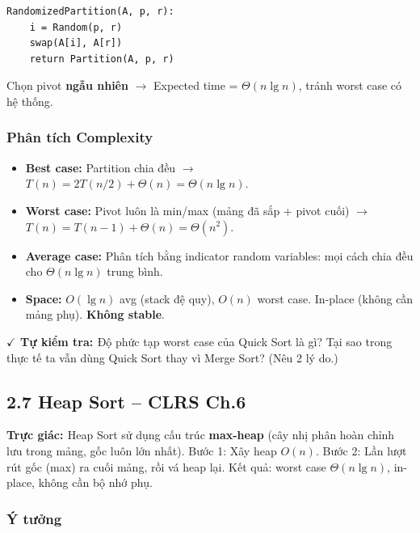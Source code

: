 \documentclass[10pt]{article}
\newcommand{\intuition}[1]{%
  \begin{tcolorbox}[colback=blue!5!white, colframe=blue!60!white, leftrule=3pt,
    toprule=0pt, bottomrule=0pt, rightrule=0pt,
    boxsep=2pt, left=6pt, right=6pt, top=4pt, bottom=4pt]
  \small\textbf{\textcolor{blue!80!black}{Trực giác: }}#1
  \end{tcolorbox}}
\newcommand{\checkpoint}[1]{%
  \begin{tcolorbox}[colback=orange!5!white, colframe=orange!70!black, leftrule=3pt,
    toprule=0pt, bottomrule=0pt, rightrule=0pt,
    boxsep=2pt, left=6pt, right=6pt, top=4pt, bottom=4pt]
  {\small\textbf{\textcolor{orange!80!black}{$\checkmark$ Tự kiểm tra: }} #1}
  \end{tcolorbox}}
\providecommand{\tightlist}{\setlength{\itemsep}{0pt}\setlength{\parskip}{0pt}}
\begin{document}
\begin{tcolorbox}[colback=gray!8, colframe=gray!50, boxrule=0.5pt, arc=2pt,
  left=6pt, right=6pt, top=4pt, bottom=4pt,
  title={\small\textbf{Pseudocode 7: Randomized Partition}}]
\begin{verbatim}
RandomizedPartition(A, p, r):
    i = Random(p, r)
    swap(A[i], A[r])
    return Partition(A, p, r)
\end{verbatim}
\end{tcolorbox}

Chọn pivot \textbf{ngẫu nhiên} \(\to\) Expected time =
\(\Theta(n \lg n)\), tránh worst case có hệ thống.

\subsubsection{Phân tích Complexity}
\begin{itemize}
\tightlist
\item \textbf{Best case:} Partition chia đều $\to$ $T(n) = 2T(n/2) + \Theta(n) = \Theta(n \lg n)$.
\item \textbf{Worst case:} Pivot luôn là min/max (mảng đã sắp + pivot cuối) $\to$ $T(n) = T(n{-}1) + \Theta(n) = \Theta(n^2)$.
\item \textbf{Average case:} Phân tích bằng indicator random variables: mọi cách chia đều cho $\Theta(n \lg n)$ trung bình.
\item \textbf{Space:} $O(\lg n)$ avg (stack đệ quy), $O(n)$ worst case. In-place (không cần mảng phụ). \textbf{Không stable}.
\end{itemize}

\checkpoint{Độ phức tạp worst case của Quick Sort là gì? Tại sao trong thực tế ta vẫn dùng Quick Sort thay vì Merge Sort? (Nêu 2 lý do.)}

\subsection{2.7 Heap Sort -- CLRS Ch.6}\label{heap-sort-clrs-ch.6}

\intuition{Heap Sort sử dụng cấu trúc \textbf{max-heap} (cây nhị phân hoàn chỉnh lưu trong mảng, gốc luôn lớn nhất). Bước 1: Xây heap $O(n)$. Bước 2: Lần lượt rút gốc (max) ra cuối mảng, rồi vá heap lại. Kết quả: worst case $\Theta(n \lg n)$, in-place, không cần bộ nhớ phụ.}

\subsubsection{Ý tưởng}
\end{document}
